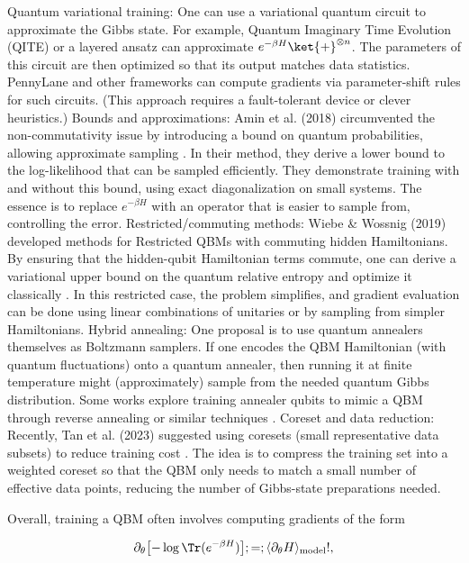 Quantum variational training: One can use a variational quantum circuit to approximate the Gibbs state. For example, Quantum Imaginary Time Evolution (QITE) or a layered ansatz can approximate $e^{-\beta H}\ket{+}^{\otimes n}$. The parameters of this circuit are then optimized so that its output matches data statistics.  PennyLane and other frameworks can compute gradients via parameter-shift rules for such circuits. (This approach requires a fault-tolerant device or clever heuristics.)
Bounds and approximations: Amin et al. (2018) circumvented the non-commutativity issue by introducing a bound on quantum probabilities, allowing approximate sampling . In their method, they derive a lower bound to the log-likelihood that can be sampled efficiently. They demonstrate training with and without this bound, using exact diagonalization on small systems.  The essence is to replace $e^{-\beta H}$ with an operator that is easier to sample from, controlling the error.
Restricted/commuting methods: Wiebe & Wossnig (2019) developed methods for Restricted QBMs with commuting hidden Hamiltonians. By ensuring that the hidden-qubit Hamiltonian terms commute, one can derive a variational upper bound on the quantum relative entropy and optimize it classically .  In this restricted case, the problem simplifies, and gradient evaluation can be done using linear combinations of unitaries or by sampling from simpler Hamiltonians.
Hybrid annealing: One proposal is to use quantum annealers themselves as Boltzmann samplers. If one encodes the QBM Hamiltonian (with quantum fluctuations) onto a quantum annealer, then running it at finite temperature might (approximately) sample from the needed quantum Gibbs distribution. Some works explore training annealer qubits to mimic a QBM through reverse annealing or similar techniques .
Coreset and data reduction: Recently, Tan et al. (2023) suggested using coresets (small representative data subsets) to reduce training cost . The idea is to compress the training set into a weighted coreset so that the QBM only needs to match a small number of effective data points, reducing the number of Gibbs-state preparations needed.




Overall, training a QBM often involves computing gradients of the form

$$

\partial_\theta \bigl[-\log \Tr(e^{-\beta H})\bigr] ;=; \langle \partial_\theta H \rangle_{\text{model}}!,

$$


